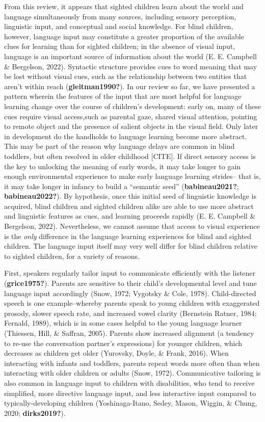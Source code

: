 \documentclass[
  man,floatsintext]{apa6}
\begin{document}
From this review, it appears that sighted children learn about the world and language simultaneously from many sources, including sensory perception, linguistic input, and conceptual and social knowledge. For blind children, however, language input may constitute a greater proportion of the available clues for learning than for sighted children; in the absence of visual input, language is an important source of information about the world (E. E. Campbell \& Bergelson, 2022). Syntactic structure provides cues to word meaning that may be lost without visual cues, such as the relationship between two entities that aren't within reach (\textbf{gleitman1990?}). In our review so far, we have presented a pattern wherein the features of the input that are most helpful for language learning change over the course of children's development: early on, many of these cues require visual access,such as parental gaze, shared visual attention, pointing to remote object and the presence of salient objects in the visual field. Only later in development do the handholds to language learning become more abstract. This may be part of the reason why language delays are common in blind toddlers, but often resolved in older childhood {[}CITE{]}. If direct sensory access is the key to unlocking the meaning of early words, it may take longer to gain enough environmental experience to make early language learning strides-- that is, it may take longer in infancy to build a ``semantic seed'' (\textbf{babineau2021?}; \textbf{babineau2022?}). By hypothesis, once this initial seed of linguistic knowledge is acquired, blind children and sighted children alike are able to use more abstract and linguistic features as cues, and learning proceeds rapidly (E. E. Campbell \& Bergelson, 2022). Nevertheless, we cannot assume that access to visual experience is the \emph{only} difference in the language learning experiences for blind and sighted children. The language input itself may very well differ for blind children relative to sighted children, for a variety of reasons.

First, speakers regularly tailor input to communicate efficiently with the listener (\textbf{grice1975?}). Parents are sensitive to their child's developmental level and tune language input accordingly (Snow, 1972; Vygotsky \& Cole, 1978). Child-directed speech is one example--whereby parents speak to young children with exaggerated prosody, slower speech rate, and increased vowel clarity (Bernstein Ratner, 1984; Fernald, 1989), which is in some cases helpful to the young language learner (Thiessen, Hill, \& Saffran, 2005). Parents show increased alignment (a tendency to re-use the conversation partner's expressions) for younger children, which decreases as children get older (Yurovsky, Doyle, \& Frank, 2016). When interacting with infants and toddlers, parents repeat words more often than when interacting with older children or adults (Snow, 1972). Communicative tailoring is also common in language input to children with disabilities, who tend to receive simplified, more directive language input, and less interactive input compared to typically-developing children (Yoshinaga-Itano, Sedey, Mason, Wiggin, \& Chung, 2020; \textbf{dirks2019?}).
\end{document}
